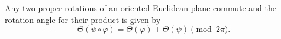 Any two proper rotations of an oriented Euclidean plane commute and the rotation angle for their product is given by
$$\Theta(\psi \circ \varphi) = \Theta(\varphi) + \Theta(\psi) \pmod{2\pi}.$$
